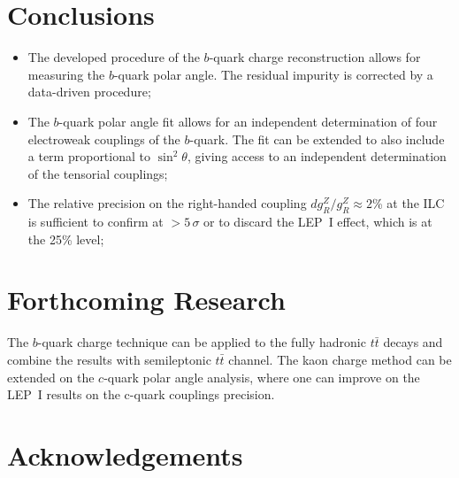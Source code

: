 \documentclass{PoS}
\begin{document}

\section*{Conclusions}

\begin{itemize}
	\item The developed procedure of the $b$-quark charge reconstruction allows for measuring the $b$-quark polar angle. The residual impurity is corrected by a data-driven procedure;
	\item The $b$-quark polar angle fit allows for an independent determination of four electroweak couplings of the $b$-quark. The fit can be extended to also include a term proportional to $\sin^2\theta$, giving access to an independent determination of the tensorial couplings;
	\item  The relative precision on the right-handed coupling $dg^Z_R/g^Z_R\approx 2$\% at the ILC is sufficient to confirm at $>5\,\sigma$ or to discard the LEP~I effect, which is at the 25\% level;
\end{itemize}


\section*{Forthcoming Research}
The $b$-quark charge technique can be applied to the fully hadronic $t\bar{t}$ decays and combine the results with semileptonic $t\bar{t}$ channel.
The kaon charge method can be extended on the $c$-quark polar angle analysis, where one can improve on the LEP~I results on the c-quark couplings precision. 

\section*{Acknowledgements}
\end{document}
